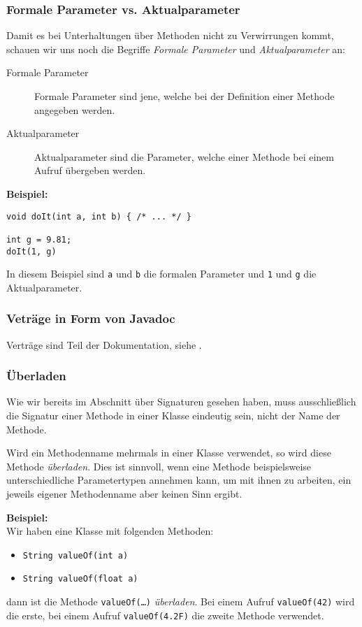 \subsubsection{Formale Parameter vs. Aktualparameter}
	Damit es bei Unterhaltungen über Methoden nicht zu Verwirrungen kommt, schauen wir uns noch die Begriffe \textit{Formale Parameter} und \textit{Aktualparameter} an:
	\begin{description}
		\item[Formale Parameter] Formale Parameter sind jene, welche bei der Definition einer Methode angegeben werden.
		\item[Aktualparameter] Aktualparameter sind die Parameter, welche einer Methode bei einem Aufruf übergeben werden.
	\end{description}

	\textbf{Beispiel:} \\
	\begin{lstlisting}
void doIt(int a, int b) { /* ... */ }

int g = 9.81;
doIt(1, g)
	\end{lstlisting}
	In diesem Beispiel sind \texttt{a} und \texttt{b} die formalen Parameter und \texttt{1} und \texttt{g} die Aktualparameter.

\subsubsection{Veträge in Form von Javadoc}
	Verträge sind Teil der Dokumentation, siehe .

\subsubsection{Überladen}
	Wie wir bereits im Abschnitt über Signaturen gesehen haben, muss ausschließlich die Signatur einer Methode in einer Klasse eindeutig sein, nicht der Name der Methode.
	
	Wird ein Methodenname mehrmals in einer Klasse verwendet, so wird diese Methode \textit{überladen}. Dies ist sinnvoll, wenn eine Methode beispielsweise unterschiedliche Parametertypen annehmen kann, um mit ihnen zu arbeiten, ein jeweils eigener Methodenname aber keinen Sinn ergibt.
	
	\textbf{Beispiel:} \\
	Wir haben eine Klasse mit folgenden Methoden:
	\begin{itemize}
		\item \lstinline|String valueOf(int a)|
		\item \lstinline|String valueOf(float a)|
	\end{itemize}
	dann ist die Methode \texttt{valueOf(\dots)} \textit{überladen}. Bei einem Aufruf \lstinline|valueOf(42)| wird die erste, bei einem Aufruf \lstinline|valueOf(4.2F)| die zweite Methode verwendet.
	

